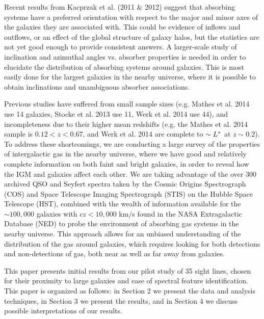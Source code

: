 \documentclass[iop]{emulateapj-rtx4}
\begin{document}


Recent results from Kacprzak et al. (2011 $\&$ 2012) suggest that absorbing systems have a preferred orientation with respect to the major and minor axes of the galaxies they are associated with. This could be evidence of inflows and outflows, or an effect of the global structure of galaxy halos, but the statistics are not yet good enough to provide consistent answers. A larger-scale study of inclination and azimuthal angles vs. absorber properties is needed in order to elucidate the distribution of absorbing systems around galaxies. This is most easily done for the largest galaxies in the nearby universe, where it is possible to obtain inclinations and unambiguous absorber associations. 


Previous studies have suffered from small sample sizes (e.g. Mathes et al. 2014 use 14 galaxies, Stocke et al. 2013 use 11, Werk et al. 2014 use 44), and incompleteness due to their higher mean redshifts (e.g. the Mathes et al. 2014 sample is $0.12 <z<0.67$, and Werk et al. 2014 are complete to $\sim L^{\**}$ at $z\sim0.2$). To address these shortcomings, we are conducting a large survey of the properties of intergalactic gas in the nearby universe, where we have good and relatively complete information on both faint and bright galaxies, in order to reveal how the IGM and galaxies affect each other. We are taking advantage of the over 300 archived QSO and Seyfert spectra taken by the Cosmic Origins Spectrograph (COS) and Space Telescope Imaging Spectrograph (STIS) on the Hubble Space Telescope (HST), combined with the wealth of information available for the $\sim100,000$ galaxies with $cz<10,000$ km/s found in the NASA Extragalactic Database (NED) to probe the environment of absorbing gas systems in the nearby universe. This approach allows for an unbiased understanding of the distribution of the gas around galaxies, which requires looking for both detections and non-detections of gas, both near as well as far away from galaxies.

This paper presents initial results from our pilot study of 35 sight lines, chosen for their proximity to large galaxies and ease of spectral feature identification. This paper is organized as follows: in Section 2 we present the data and analysis techniques, in Section 3 we present the results, and in Section 4 we discuss possible interpretations of our results.
\end{document}

